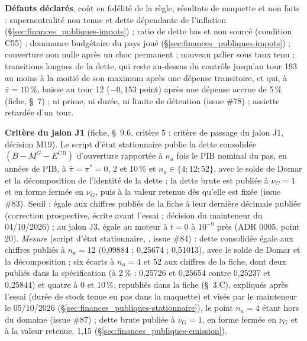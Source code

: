 \documentclass[11pt,a4paper]{article}
\newcommand{\code}[1]{\texttt{\detokenize{#1}}}
\begin{document}
\begin{proposee}
\textbf{Défauts déclarés}, coût en fidélité de la règle, résultats de maquette et non faits : superneutralité non tenue et dette dépendante de l'inflation (\S\ref{sec:finances_publiques-impots}) ; ratio de dette bas et non sourcé (condition C55) ; dominance budgétaire du pays joué (\S\ref{sec:finances_publiques-impots}) ; couverture non nulle après un choc permanent ; nouveau palier sous taux tenu ; transitions longues de la dette, qui reste au-dessus du contrôle jusqu'au tour 193 au moins à la moitié de son maximum après une dépense transitoire, et qui, à $\bar\pi = 10\,\%$, baisse au tour 12 ($-0{,}153$ point) après une dépense accrue de 5\,\% (fiche, \S~7) ; ni prime, ni durée, ni limite de détention (issue \#78) ; assiette retardée d'un tour.

\textbf{Critère du jalon J1} (fiche, \S~9.6, critère 5 ; critère de passage du jalon J1, décision M19). Le script d'état stationnaire publie la dette consolidée $(B - M^G - E^{\mathit{CB}})$ d'ouverture rapportée à $n_a$ fois le PIB nominal du pas, en années de PIB, à $\bar\pi = \pi^\ast = 0$, 2 et 10\,\% et $n_a \in \{4 ; 12 ; 52\}$, avec le solde de Domar et la décomposition de l'identité de la dette ; la dette brute est publiée à $\nu_G = 1$ et en forme fermée en $\nu_G$, puis à la valeur retenue dès qu'elle est fixée (issue \#83). Seuil : égale aux chiffres publiés de la fiche à leur dernière décimale publiée (correction prospective, écrite avant l'essai ; décision du mainteneur du 04/10/2026) ; au jalon J3, égale au moteur à $t = 0$ à $10^{-9}$ près (ADR 0005, point 20). \emph{Mesure} (script d'état stationnaire, \code{outils/etat_stationnaire.py}, issue \#84) : dette consolidée égale aux chiffres publiés à $n_a = 12$ (0,09884 ; 0,25674 ; 0,51013), avec le solde de Domar et la décomposition ; six écarts à $n_a = 4$ et 52 aux chiffres de la fiche, dont deux publiés dans la spécification (à 2\,\% : 0,25726 et 0,25654 contre 0,25237 et 0,25844) et quatre à 0 et 10\,\%, republiés dans la fiche (\S~3.C), expliqués après l'essai (durée de stock tenue en pas dans la maquette) et visés par le mainteneur le 05/10/2026 (\S\ref{sec:finances_publiques-stationnaire}), le point $n_a = 4$ étant hors du domaine (issue \#87) ; dette brute publiée à $\nu_G = 1$, en forme fermée en $\nu_G$ et à la valeur retenue, 1,15 (\S\ref{sec:finances_publiques-emission}).


\end{proposee}
\end{document}
